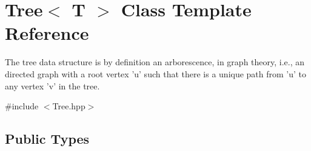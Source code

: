 \hypertarget{class_d_o_1_1_tree}{\section{Tree$<$ T $>$ Class Template Reference}
\label{class_d_o_1_1_tree}
}


The tree data structure is by definition an arborescence, in graph theory, i.\-e., an directed graph with a root vertex 'u' such that there is a unique path from 'u' to any vertex 'v' in the tree.  




{\ttfamily \#include $<$Tree.\-hpp$>$}

\subsection*{Public Types}
